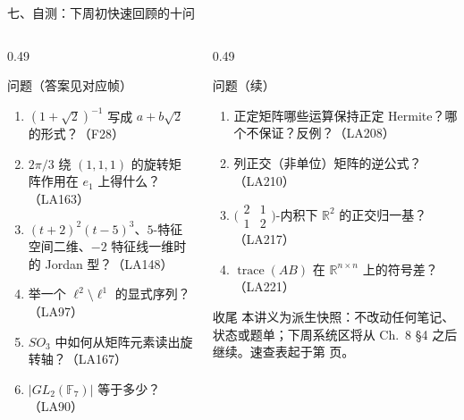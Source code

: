 \documentclass[aspectratio=169,10pt,fontset=none]{ctexbeamer}
\begin{document}
\begin{frame}[t]{七、自测：下周初快速回顾的十问}
  \begin{columns}[T,onlytextwidth]
    \begin{column}{0.49\textwidth}
      \begin{exampleblock}{\footnotesize 问题（答案见对应帧）}
        \scriptsize
        \begin{enumerate}\setlength{\itemsep}{1pt}
          \item $(1+\sqrt2)^{-1}$ 写成 $a+b\sqrt2$ 的形式？（F28）
          \item $2\pi/3$ 绕 $(1,1,1)$ 的旋转矩阵作用在 $e_1$ 上得什么？（LA163）
          \item $(t+2)^2(t-5)^3$、$5$-特征空间二维、$-2$ 特征线一维时的 Jordan 型？（LA148）
          \item 举一个 $\ell^2\setminus\ell^1$ 的显式序列？（LA97）
          \item $SO_3$ 中如何从矩阵元素读出旋转轴？（LA167）
          \item $|GL_2(\mathbb F_7)|$ 等于多少？（LA90）
        \end{enumerate}
      \end{exampleblock}
    \end{column}
    \begin{column}{0.49\textwidth}
      \begin{exampleblock}{\footnotesize 问题（续）}
        \scriptsize
        \begin{enumerate}\setlength{\itemsep}{1pt}\setcounter{enumi}{6}
          \item 正定矩阵哪些运算保持正定 Hermite？哪个不保证？反例？（LA208）
          \item 列正交（非单位）矩阵的逆公式？（LA210）
          \item $\bigl(\begin{smallmatrix}2&1\\1&2\end{smallmatrix}\bigr)$-内积下 $\mathbb R^2$ 的正交归一基？（LA217）
          \item $\operatorname{trace}(AB)$ 在 $\mathbb R^{n\times n}$ 上的符号差？（LA221）
        \end{enumerate}
      \end{exampleblock}
      \begin{block}{\footnotesize 收尾}
        \scriptsize
        本讲义为派生快照：不改动任何笔记、状态或题单；下周系统区将从 Ch.~8 \S4 之后继续。速查表起于第 \pageref{sec:answers} 页。
      \end{block}
    \end{column}
  \end{columns}
\end{frame}
\end{document}

